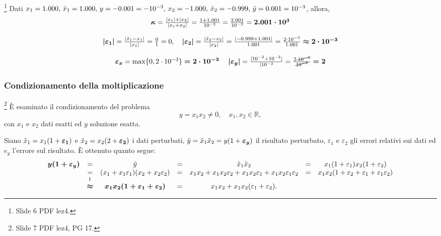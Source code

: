 \begin{example}
	\footnote{Slide 6 PDF lez4.} Dati $x_1=1.000,\, \Tilde{x}_1=1.000,\, y=-0.001=-10^{-3},\, x_2=-1.000,\,\Tilde{x}_2=-0.999,\, \Tilde{y}=0.001=10^{-3}$, allora,
	\begin{equation*}
		\begin{matrix}
			\boldsymbol\kappa=\frac{|x_1|+|x_2|}{|x_1+x_2|}=\frac{1+1.001}{10^{-3}}=\frac{2.001}{10^{-3}}=\boldsymbol{2.001\cdot 10^3}\\\\
			\boldsymbol{|\varepsilon_1|}=\frac{|\Tilde{x}_1-x_1|}{|x_1|}=\frac{0}{1}=0,\quad \boldsymbol{|\varepsilon_2|}=\frac{|\Tilde{x}_2-x_2|}{|x_2|}=\frac{|-0.999+1.001|}{1.001}=\frac{2\cdot 10^{-3}}{1.001}\boldsymbol{\approx 2\cdot 10^{-3}}\\\\
			\boldsymbol{\varepsilon_x}=\max\{0,2\cdot10^{-3}\}\boldsymbol{=2\cdot 10^{-3}}\quad\boldsymbol{|\varepsilon_y|}=\frac{|10^{-3}+10^{-3}|}{|10^{-3}}=\frac{2\cdot \cancel{10^{-3}}}{\cancel{10^{-3}}}\boldsymbol{=2}
		\end{matrix}
	\end{equation*}
\end{example}

\subsubsection{Condizionamento della moltiplicazione}
\footnote{Slide 7 PDF lez4, PG 17.} È esaminato il condizionamento del problema
\begin{equation}\label{eq:problema_condizionamento_moltiplicazione}
	y=x_1x_2\neq 0,\quad x_1,x_2\in\mathbb R,
\end{equation}
con $x_1$ e $x_2$ dati esatti ed $y$ soluzione esatta. 

Siano $\Tilde{x}_1=x_1(1+\boldsymbol{\varepsilon_1})$ e $\Tilde{x}_2=x_2(2+\boldsymbol{\varepsilon_2})$ i dati perturbati, $\Tilde{y}=\Tilde{x}_1\Tilde{x}_2=y(1+\boldsymbol{\varepsilon_y})$ il risultato perturbato, $\varepsilon_1$ e $\varepsilon_2$ gli errori relativi sui dati ed $e_y$ l'errore sul risultato. È ottenuto quanto segue:
\begin{equation*}
	\begin{matrix}
		\boldsymbol{y(1+\varepsilon_y)}&=&\Tilde{y}&=&\Tilde{x}_1\Tilde{x}_2&=&x_1(1+\varepsilon_1)x_2(1+\varepsilon_2)\\
		&=&(x_1+x_1\varepsilon_1)(x_2+x_2\varepsilon_2) &=&x_1x_2+x_1x_2\varepsilon_2+x_1x_2\varepsilon_1+x_1x_2\varepsilon_1\varepsilon_2&=&x_1x_2(1+\varepsilon_2+\varepsilon_1+\varepsilon_1\varepsilon_2)\\
		&\overset{\footnotemark}{\boldsymbol{\approx}}&\boldsymbol{x_1x_2(1+\varepsilon_1+\varepsilon_2)}&=&x_1x_2+x_1x_2(\varepsilon_1+\varepsilon_2).
	\end{matrix}
\end{equation*}

